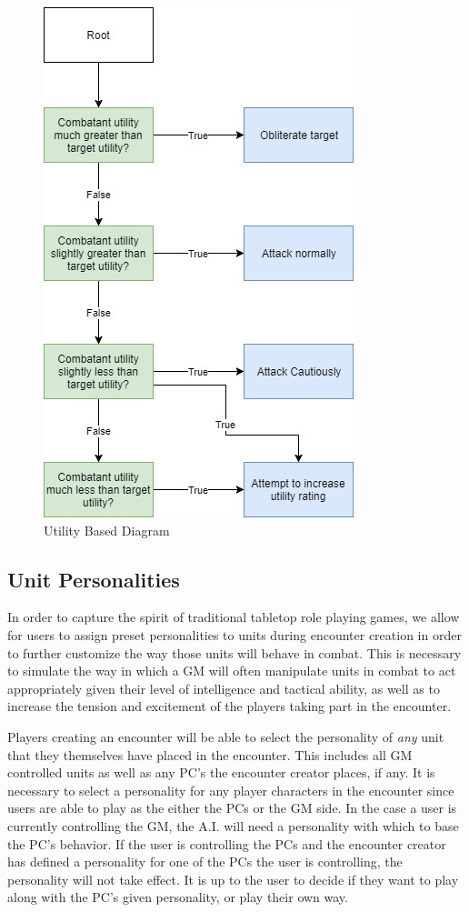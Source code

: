 \documentclass[12pt,a4paper]{report}
\begin{document}
		\begin{figure}
			\centering
			\includegraphics[scale=.8]{utilityBased}
			\caption{Utility Based Diagram}
			\label{fig: Utility Based}
		\end{figure}
				
		
		\subsection{Unit Personalities}
		In order to capture the spirit of traditional tabletop role playing games, we allow for users to assign preset personalities to units during encounter creation in order to further customize the way those units will behave in combat. This is necessary to simulate the way in which a GM will often manipulate units in combat to act appropriately given their level of intelligence and tactical ability, as well as to increase the tension and excitement of the players taking part in the encounter. 
		
		Players creating an encounter will be able to select the personality of \textit{any} unit that they themselves have placed in the encounter. This includes all GM controlled units as well as any PC's the encounter creator places, if any. It is necessary to select a personality for any player characters in the encounter since users are able to play as the either the PCs or the GM side. In the case a user is currently controlling the GM, the A.I. will need a personality with which to base the PC's behavior. If the user is controlling the PCs and the encounter creator has defined a personality for one of the PCs the user is controlling, the personality will not take effect. It is up to the user to decide if they want to play along with the PC's given personality, or play their own way. 
		
\end{document}
